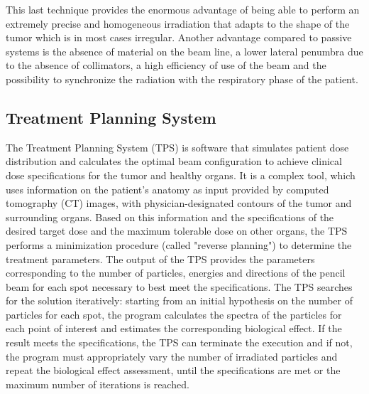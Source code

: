 \noindent This last technique provides the enormous advantage of being able to perform an extremely precise and homogeneous irradiation that adapts to the shape of the tumor which is in most cases irregular.
Another advantage compared to passive systems is the absence of material on the beam line, a lower lateral penumbra due to the absence of collimators, a high efficiency of use of the beam and the possibility to synchronize the radiation with the respiratory phase of the patient.

\subsection{Treatment Planning System}
\noindent The Treatment Planning System (TPS) is software that simulates patient dose distribution and calculates the optimal beam configuration to achieve clinical dose specifications for the tumor and healthy organs.
It is a complex tool, which uses information on the patient's anatomy as input provided by computed tomography (CT) images, with physician-designated contours of the tumor and surrounding organs.
Based on this information and the specifications of the desired target dose and the maximum tolerable dose on other organs, the TPS performs a minimization procedure (called "reverse planning") to determine the treatment parameters.
The output of the TPS provides the parameters corresponding to the number of particles, energies and directions of the pencil beam for each spot necessary to best meet the specifications.
The TPS searches for the solution iteratively: starting from an initial hypothesis on the number of particles for each spot, the program calculates the spectra of the particles for each point of interest and estimates the corresponding biological effect.
If the result meets the specifications, the TPS can terminate the execution and if not, the program must appropriately vary the number of irradiated particles and repeat the biological effect assessment, until the specifications are met or the maximum number of iterations is reached.


